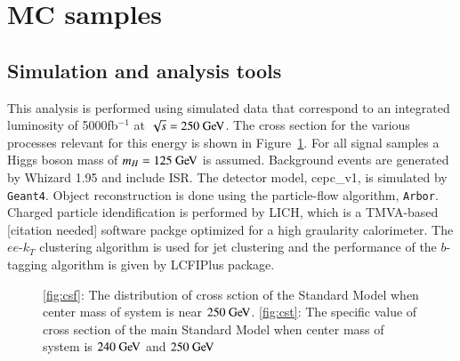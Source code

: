 \documentclass[11pt,a4paper]{cepcnote}
\begin{document}
\section{MC samples}
\subsection{Simulation and analysis tools}
This analysis is performed using simulated data that correspond to an integrated luminosity of 5000fb$^{-1}$ at $\sqrt s =250\gev$.
The cross section for the various processes relevant for this energy is shown in Figure~\ref{fig:cs}. 
For all signal samples a Higgs boson mass of $m_H = 125\gev$ is assumed. Background events are generated by Whizard 1.95 and include ISR. 
The detector model, cepc\_v1, is simulated by {\tt Geant4}. Object reconstruction is done using the particle-flow algorithm, {\tt Arbor}. 
Charged particle idendification is performed by LICH, which is a TMVA-based [citation needed] software packge optimized for a high graularity calorimeter. 
The $ee$-$k_T$ clustering algorithm is used for jet clustering and the performance of the $b$-tagging algorithm is given by LCFIPlus package.

\begin{figure}[H]
	\centering
	\caption[]{\ref{fig:csf}: The distribution of cross sction of the Standard Model when center mass of system is near $250\gev$.
	\ref{fig:cst}: The specific value of cross section of the main Standard Model when center mass of system is $240\gev$ and $250\gev$}
	\label{fig:cs}
\end{figure}
\end{document}
